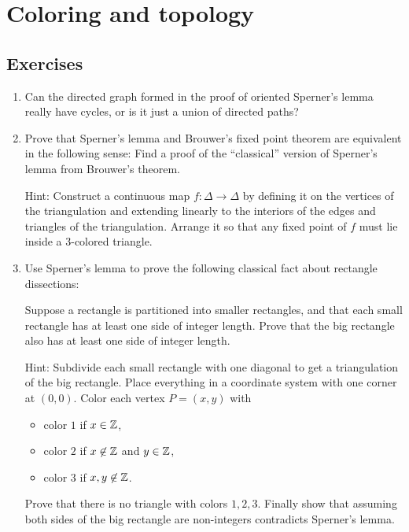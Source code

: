 \chapter{Coloring and topology}


\section{Exercises}

\begin{enumerate}
\item Can the directed graph formed in the proof of oriented Sperner's lemma really have cycles, or is it just a union of directed paths?

\item Prove that Sperner's lemma and Brouwer's fixed point theorem are equivalent in the following sense: Find a proof of the ``classical'' version of Sperner's lemma from Brouwer's theorem.

\smallskip
Hint: Construct a continuous map $f:\Delta\to \Delta$ by defining it on the vertices of the triangulation and extending linearly to the interiors of the edges and triangles of the triangulation. Arrange it so that any fixed point of $f$ must lie inside a $3$-colored triangle.

\item Use Sperner's lemma to prove the following classical fact about rectangle dissections:

Suppose a rectangle is partitioned into smaller rectangles, and that each small rectangle has at least one side of integer length. Prove that the big rectangle also has at least one side of integer length.

\smallskip
Hint: Subdivide each small rectangle with one diagonal to get a triangulation of the big rectangle. Place everything in a coordinate system with one corner at $(0,0)$. Color each vertex $P=(x,y)$ with 
\begin{itemize}
\item color $1$ if $x\in\mathbb{Z}$,
\item color $2$ if $x\not\in\mathbb{Z}$ and $y\in \mathbb{Z}$,
\item color $3$ if $x,y\not\in\mathbb{Z}$.
\end{itemize}
Prove that there is no triangle with colors $1,2,3$. Finally show that assuming both sides of the big rectangle are non-integers contradicts Sperner's lemma.
\end{enumerate}